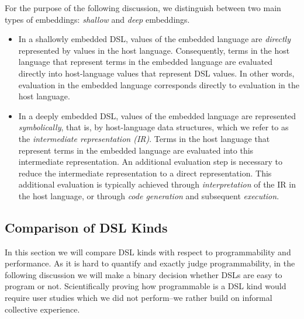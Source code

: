 For the purpose of the following discussion, we distinguish between two main types of embeddings: \emph{shallow} and \emph{deep} embeddings.

  \begin{itemize}

  \item In a shallowly embedded DSL, values of the embedded language
    are \emph{directly} represented by values in the host language.
    Consequently, terms in the host language that represent terms in
    the embedded language are evaluated directly into host-language
    values that represent DSL values. In other words, evaluation in
    the embedded language corresponds directly to evaluation in the
    host language.


  \item In a deeply embedded DSL, values of the embedded language are
    represented \emph{symbolically}, that is, by host-language data
    structures, which we refer to as the \emph{intermediate
      representation (IR)}. Terms in the host language that represent
    terms in the embedded language are evaluated into this intermediate
    representation. An additional evaluation step is necessary to
    reduce the intermediate representation to a direct representation.
    This additional evaluation is typically achieved through
    \emph{interpretation} of the IR in the host language, or through
    \emph{code generation} and subsequent \emph{execution}.

  \end{itemize}


\subsection{Comparison of DSL Kinds}
\label{sec:comparison-of-dsl-kinds}

In this section we will compare DSL kinds with respect to programmability and performance.
 As it is hard to quantify and exactly judge programmability, in the following discussion we
 will make a binary decision whether DSLs are easy to program or not. Scientifically proving
 how programmable is a DSL kind would require user studies which we did not perform--we rather
 build on informal collective experience.

